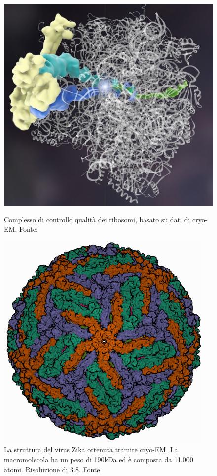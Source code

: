 {\begin{figure}[!htb]
	\centering
	\includegraphics[scale=1.5]{images/cryo-ribosoma.jpg}
	\caption{Complesso di controllo qualità dei ribosomi, basato su dati di cryo-EM. Fonte: \cite{cryoRevolutionUCSF}}
	\label{fig:cryo-ribosoma}
	\endminipage\hfill
	\centering
	\includegraphics[scale=1.5]{images/cryo-zika.jpeg}
	\caption{La struttura del virus Zika ottenuta tramite cryo-EM. La macromolecola ha un peso di 190kDa ed è composta da 11.000 atomi. Risoluzione di 3.8\angstrom. Fonte \cite{cryoZika}}
	\label{fig:cryo-zika}
	\endminipage\hfill
\end{figure}

}
